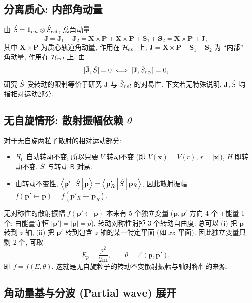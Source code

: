 \subsection{分离质心: 内部角动量}

由 $\hat{S}=\mathbf{1}_{cm}\otimes \hat{S}_{rel}$, 总角动量
\begin{equation}
\bar{\mathbf{J}}=\mathbf{J}_1+\mathbf{J}_2 =\bar{\mathbf{X}}\times \bar{\mathbf{P}} + \mathbf{X}\times\mathbf{P} +\mathbf{S}_1+\mathbf{S}_2 = \bar{\mathbf{X}}\times \bar{\mathbf{P}} + \mathbf{J},
\end{equation}
其中 $\bar{\mathbf{X}}\times\bar{\mathbf{P}}$ 为质心轨道角动量, 作用在 $\mathcal{H}_{cm}$ 上; $\mathbf{J}=\mathbf{X}\times \mathbf{P}+\mathbf{S}_1+\mathbf{S}_2$ 为 ``内部'' 角动量, 作用在 $\mathcal{H}_{rel}$ 上. 由
\[
[\bar{\mathbf{J}},\hat{S}]=0\;\Longleftrightarrow\;[\mathbf{J},\hat{S}_{rel}]=0,
\]
研究 $\hat{S}$ 受转动的限制等价于研究 $\mathbf{J}$ 与 $\hat{S}_{rel}$ 的对易性. 下文若无特殊说明, $\mathbf{J}, \hat{S}$ 均指相对运动部分.

\subsection{无自旋情形: 散射振幅依赖 \texorpdfstring{$\theta$}{theta}}

对于无自旋两粒子散射的相对运动部分:
\begin{itemize}
  \item $H_0$ 自动转动不变, 所以只要 $V$ 转动不变 (即 $V(\mathbf{x})=V(r)$, $r=|\mathbf{x}|$), $H$ 即转动不变, $\hat{S}$ 与转动 $\mathsf{R}$ 对易.
  \item 由转动不变性, $\left\langle \mathbf{p}' \,\middle|\, \hat{S} \,\middle|\, \mathbf{p} \right\rangle=\left\langle \mathbf{p}'_{R} \,\middle|\, \hat{S} \,\middle|\, \mathbf{p}_{R} \right\rangle$, 因此散射振幅 $f(\mathbf{p}'\leftarrow \mathbf{p})=f(\mathbf{p}'_{R}\leftarrow \mathbf{p}_{R})$.
\end{itemize}

无对称性的散射振幅 $f(\mathbf{p}'\leftarrow \mathbf{p})$ 本来有 5 个独立变量 ($\mathbf{p}, \mathbf{p}'$ 方向 4 个 +能量 1 个; 由能量守恒 $|\mathbf{p}'|=|\mathbf{p}|=p$). 转动对称性消掉 3 个转动自由度: 总可以 (i) 把 $\mathbf{p}$ 转到 $z$ 轴, (ii) 把 $\mathbf{p}'$ 转到包含 $z$ 轴的某一特定平面 (如 $xz$ 平面). 因此独立变量只剩 2 个, 可取
\begin{equation}
E_p=\frac{p^2}{2\mathrm{m}},\qquad \theta=\angle(\mathbf{p},\mathbf{p}'),
\end{equation}
即 $f=f(E,\theta)$. 这就是无自旋粒子的转动不变散射振幅与轴对称性的来源.

\subsection{角动量基与分波 (Partial wave) 展开}

